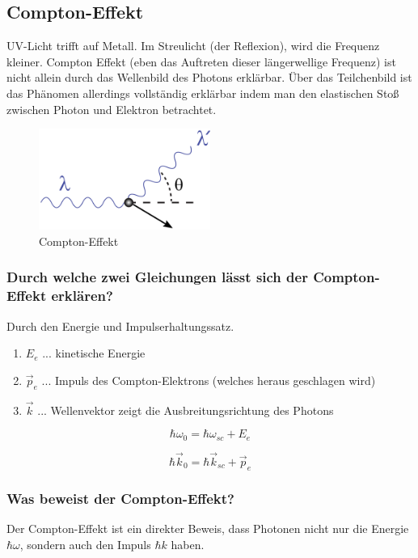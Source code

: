\documentclass{article}
\begin{document}
\subsection{Compton-Effekt }\label{k1:comptonEf}
UV-Licht trifft auf Metall. Im Streulicht (der Reflexion), wird die Frequenz kleiner.
Compton Effekt (eben das Auftreten dieser längerwellige Frequenz) ist nicht allein durch das Wellenbild des Photons erklärbar.
Über das Teilchenbild ist das Phänomen allerdings vollständig erklärbar indem man den elastischen Stoß zwischen Photon und Elektron betrachtet.

\begin{figure}[H]
    \centering
    \includegraphics[width=0.5\textwidth]{fig/compton}
    \caption{Compton-Effekt}
    \label{fig:comptonEffect}
\end{figure}

\subsubsection{Durch welche zwei Gleichungen lässt sich der Compton-Effekt erklären?}
Durch den Energie und Impulserhaltungssatz. 

\begin{enumerate}
    \item $E_e$ ... kinetische Energie
    \item $\vec{p}_e$ ... Impuls des Compton-Elektrons (welches heraus geschlagen wird)
    \item $\vec{k}$ ... Wellenvektor zeigt die Ausbreitungsrichtung des Photons
\end{enumerate}
\begin{equation}
    \hbar \omega_0 = \hbar \omega_{sc} + E_e
\end{equation}

\begin{equation}
    \hbar \vec{k}_0 = \hbar \vec{k}_{sc} + \vec{p}_e
\end{equation}

\subsubsection{Was beweist der Compton-Effekt?}
Der Compton-Effekt ist ein direkter Beweis, dass Photonen nicht nur die Energie $\hbar \omega$, sondern auch den Impuls $\hbar k$ haben.
\end{document}

